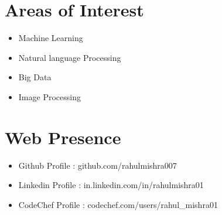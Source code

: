 \documentclass[a4paper,10pt]{article}
\begin{document}
\section{Areas of Interest}
\begin{itemize}
  \item Machine Learning
  \item Natural language Processing
  \item Big Data
  \item Image Processing
\end{itemize}

\section{Web Presence }
\begin{itemize}
  \item Github Profile : github.com/rahulmishra007
  \item Linkedin Profile : in.linkedin.com/in/rahulmishra01
  \item CodeChef Profile : codechef.com/users/rahul\_mishra01
\end{itemize}
\end{document}
